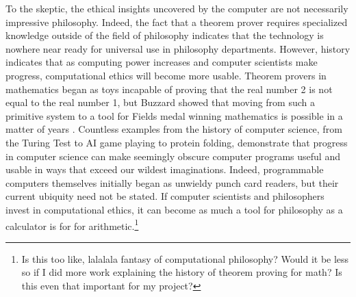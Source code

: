 \begin{isabellebody}
\begin{isamarkuptext}
To the skeptic, the ethical insights uncovered by the computer are not necessarily impressive 
philosophy. Indeed, the fact that a theorem prover requires specialized knowledge outside of the field 
of philosophy indicates that the technology is nowhere near ready for universal use in philosophy 
departments. However, history indicates that as computing power increases and computer scientists make 
progress, computational ethics will become more usable. Theorem provers in mathematics began as toys 
incapable of proving that the real number 2 is not equal to the real number 1, but Buzzard showed that 
moving from such a primitive system to a tool for Fields medal winning mathematics is possible in a 
matter of years \cite{buzzardvideo}. Countless examples from the history of computer science, from the Turing 
Test to AI game playing to protein folding, demonstrate that progress in computer science can make seemingly 
obscure computer programs useful and usable in ways that exceed our wildest imaginations. Indeed, 
programmable computers themselves initially began as unwieldy punch card readers, but their current ubiquity 
need not be stated. If computer scientists and philosophers invest in computational ethics, it can 
become as much a tool for philosophy as a calculator is for for arithmetic.\footnote{Is this too like, 
lalalala fantasy of computational philosophy? Would it be less so if I did more work explaining 
the history of theorem proving for math? Is this even that important for my project?}%
\end{isamarkuptext}\isamarkuptrue%
%
\isadelimtheory
%
\endisadelimtheory
%
\isatagtheory
%
\endisatagtheory
{\isafoldtheory}%
%
\isadelimtheory
%
\endisadelimtheory
%
\end{isabellebody}%
\endinput
